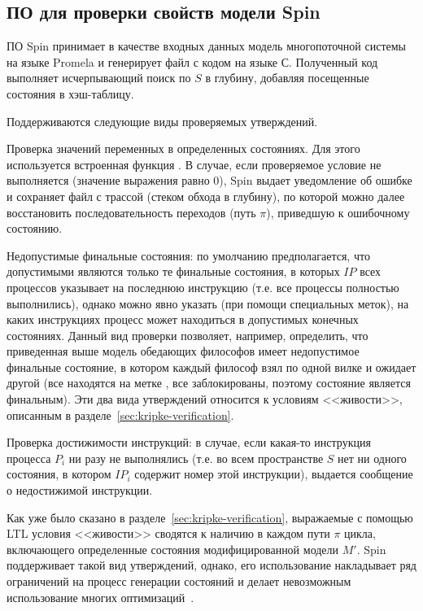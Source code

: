 \subsection{ПО для проверки свойств модели Spin}
\label{sec:spin}

ПО Spin принимает в качестве входных данных модель многопоточной системы на языке Promela
и генерирует файл с кодом на языке С. Полученный код выполняет исчерпывающий поиск по $S$
в глубину, добавляя посещенные состояния в хэш-таблицу.

Поддерживаются следующие виды проверяемых утверждений. 

Проверка значений переменных в определенных состояниях. Для этого используется встроенная
функция . В случае, если проверяемое условие не выполняется (значение
выражения равно 0), Spin выдает уведомление об ошибке и сохраняет файл с трассой (стеком
обхода в глубину), по которой можно далее восстановить последовательность переходов (путь
$\pi$), приведшую к ошибочному состоянию.

Недопустимые финальные состояния: по умолчанию предполагается, что допустимыми являются
только те финальные состояния, в которых $IP$ всех процессов указывает на последнюю
инструкцию (т.е. все процессы полностью выполнились), однако можно явно указать (при
помощи специальных меток), на каких инструкциях процесс может находиться в допустимых
конечных состояниях. Данный вид проверки позволяет, например, определить, что приведенная
выше модель обедающих философов имеет недопустимое финальные состояние, в котором каждый
философ взял по одной вилке и ожидает другой (все находятся на метке , все
заблокированы, поэтому состояние является финальным). Эти два вида утверждений относится к
условиям <<живости>>, описанным в разделе~\ref{sec:kripke-verification}.

Проверка достижимости инструкций: в случае, если какая-то инструкция процесса $P_i$ ни
разу не выполнялись (т.е. во всем пространстве $S$ нет ни одного состояния, в котором
$IP_i$ содержит номер этой инструкции), выдается сообщение о недостижимой инструкции.

Как уже было сказано в разделе~\ref{sec:kripke-verification}, выражаемые с помощью LTL
условия <<живости>> сводятся к наличию в каждом пути $\pi$ цикла, включающего определенные
состояния модифицированной модели $M'$. Spin поддерживает такой вид утверждений, однако,
его использование накладывает ряд ограничений на процесс генерации состояний и делает
невозможным использование многих оптимизаций~\cite{SpinRoot}.

